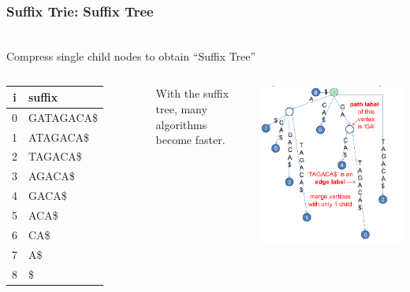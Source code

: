 \begin{frame}
  \frametitle{Suffix Trie: Suffix Tree}
  {\smaller
  \begin{center}
    \\
    Compress single child nodes to obtain ``Suffix Tree''
  \end{center}
  \begin{columns}[T]

    \begin{tabular}{c|l}
      i & suffix\\
      \hline
      0 & GATAGACA\$\\
      1 & ATAGACA\$\\
      2 & TAGACA\$\\
      3 & AGACA\$\\
      4 & GACA\$\\
      5 & ACA\$\\
      6 & CA\$\\
      7 & A\$\\
      8 & \$\\
    \end{tabular}

    \bigskip

    With the suffix tree, many algorithms become faster.


    \includegraphics[width=.9\textwidth]{../img/suffixtree_halim}
  \end{columns}
  }
\end{frame}

